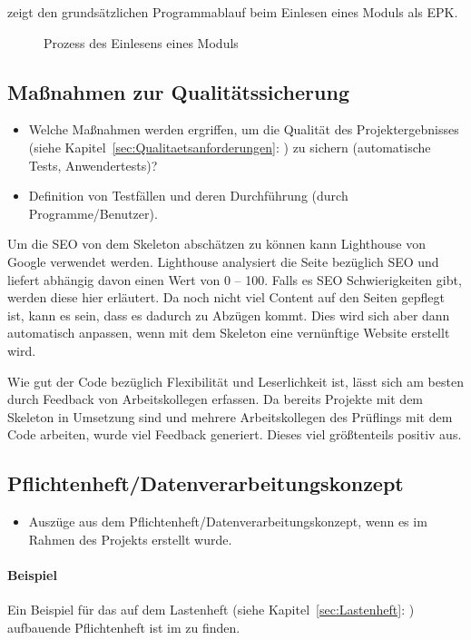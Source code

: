  zeigt den grundsätzlichen Programmablauf beim Einlesen eines Moduls als \ac{EPK}.
\begin{figure}[htb]
\centering
{}
\caption{Prozess des Einlesens eines Moduls}
\label{fig:Modulimport}
\end{figure}


\subsection{Maßnahmen zur Qualitätssicherung}
\label{sec:Qualitaetssicherung}
\begin{itemize}
	\item Welche Maßnahmen werden ergriffen, um die Qualität des Projektergebnisses (siehe Kapitel~\ref{sec:Qualitaetsanforderungen}: ) zu sichern (\zB automatische Tests, Anwendertests)?
	\item \Ggfs Definition von Testfällen und deren Durchführung (durch Programme/Benutzer).
\end{itemize}

Um die SEO von dem Skeleton abschätzen zu können kann Lighthouse von Google verwendet werden. Lighthouse analysiert die Seite bezüglich SEO und liefert abhängig davon einen Wert von 0 – 100. Falls es SEO Schwierigkeiten gibt, werden diese hier erläutert. Da noch nicht viel Content auf den Seiten gepflegt ist, kann es sein, dass es dadurch zu Abzügen kommt. Dies wird sich aber dann automatisch anpassen, wenn mit dem Skeleton eine vernünftige Website erstellt wird.

Wie gut der Code bezüglich Flexibilität und Leserlichkeit ist, lässt sich am besten durch Feedback von Arbeitskollegen erfassen. Da bereits Projekte mit dem Skeleton in Umsetzung sind und mehrere Arbeitskollegen des Prüflings mit dem Code arbeiten, wurde viel Feedback generiert. Dieses viel größtenteils positiv aus.

\subsection{Pflichtenheft/Datenverarbeitungskonzept}
\label{sec:Pflichtenheft}
\begin{itemize}
	\item Auszüge aus dem Pflichtenheft/Datenverarbeitungskonzept, wenn es im Rahmen des Projekts erstellt wurde.
\end{itemize}

\paragraph{Beispiel}
Ein Beispiel für das auf dem Lastenheft (siehe Kapitel~\ref{sec:Lastenheft}: ) aufbauende Pflichtenheft ist im  zu finden.
